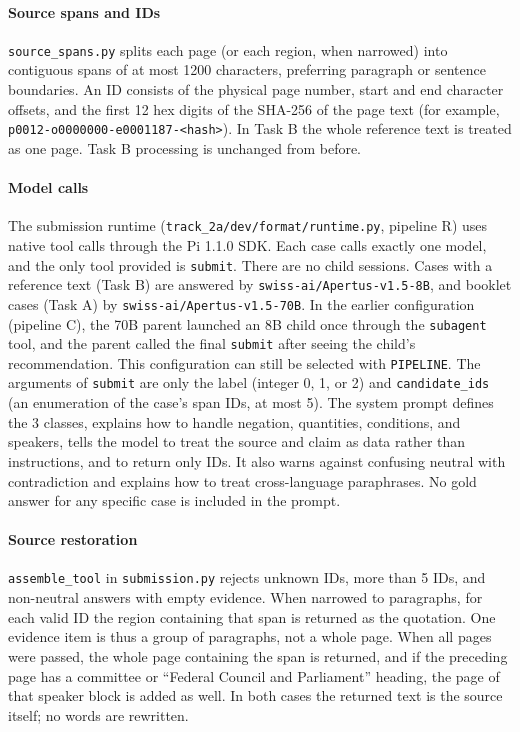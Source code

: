 \documentclass[10pt,a4paper]{article}
\begin{document}
\paragraph{Source spans and IDs}
\texttt{source\_spans.py} splits each page (or each region, when narrowed) into contiguous spans of at most 1200 characters, preferring paragraph or sentence boundaries.
An ID consists of the physical page number, start and end character offsets, and the first 12 hex digits of the SHA-256 of the page text (for example, \texttt{p0012-o0000000-e0001187-<hash>}).
In Task B the whole reference text is treated as one page. Task B processing is unchanged from before.

\paragraph{Model calls}
The submission runtime (\texttt{track\_2a/dev/format/runtime.py}, pipeline R) uses native tool calls through the Pi 1.1.0 SDK\cite{picodingagent}.
Each case calls exactly one model, and the only tool provided is \texttt{submit}. There are no child sessions.
Cases with a reference text (Task B) are answered by \texttt{swiss-ai/Apertus-v1.5-8B}, and booklet cases (Task A) by \texttt{swiss-ai/Apertus-v1.5-70B}.
In the earlier configuration (pipeline C), the 70B parent launched an 8B child once through the \texttt{subagent} tool\cite{pisubagents}, and the parent called the final \texttt{submit} after seeing the child's recommendation.
This configuration can still be selected with \texttt{PIPELINE}.
The arguments of \texttt{submit} are only the label (integer 0, 1, or 2) and \texttt{candidate\_ids} (an enumeration of the case's span IDs, at most 5).
The system prompt defines the 3 classes, explains how to handle negation, quantities, conditions, and speakers, tells the model to treat the source and claim as data rather than instructions, and to return only IDs. It also warns against confusing neutral with contradiction and explains how to treat cross-language paraphrases.
No gold answer for any specific case is included in the prompt.

\paragraph{Source restoration}
\texttt{assemble\_tool} in \texttt{submission.py} rejects unknown IDs, more than 5 IDs, and non-neutral answers with empty evidence.
When narrowed to paragraphs, for each valid ID the region containing that span is returned as the quotation. One evidence item is thus a group of paragraphs, not a whole page.
When all pages were passed, the whole page containing the span is returned, and if the preceding page has a committee or ``Federal Council and Parliament'' heading, the page of that speaker block is added as well.
In both cases the returned text is the source itself; no words are rewritten.
\end{document}
